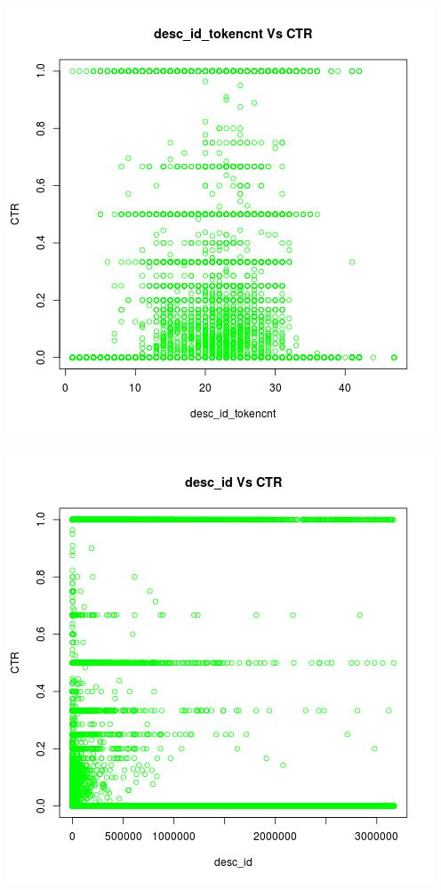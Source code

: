 \documentclass[10pt]{article}
\begin{document}
\includegraphics[scale=0.5]{desc_id_tokencnt_Vs_CTR}\\\\
\includegraphics[scale=0.5]{desc_id_Vs_CTR}
\end{document}
